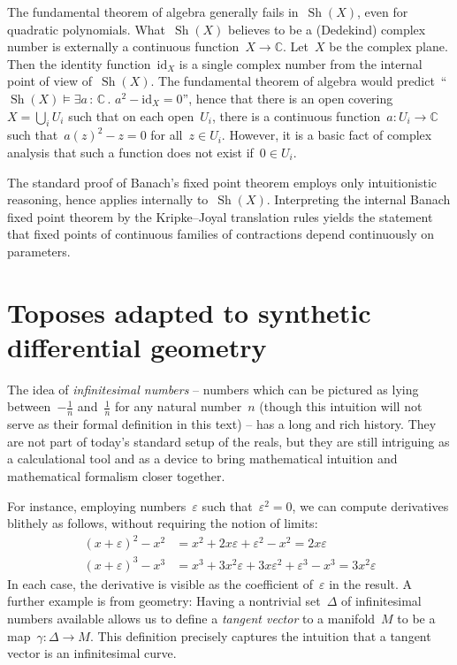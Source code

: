 \documentclass[graybox]{svmult}
\newcommand{\CC}{\mathbb{C}}
\DeclareMathOperator{\Sh}{Sh}
\renewcommand{\_}{\mathpunct{.}\,}
\newcommand{\?}{\,{:}\,}
\begin{document}
\begin{example}The fundamental theorem of algebra generally fails in~$\Sh(X)$, even
for quadratic polynomials. What~$\Sh(X)$ believes to be a (Dedekind)
complex number is externally a continuous function~$X \to \CC$. Let~$X$ be the
complex plane. Then the identity function~$\mathrm{id}_X$ is a single complex number from the
internal point of view of~$\Sh(X)$. The fundamental theorem of algebra would
predict~``$\Sh(X) \models \exists a\?\CC\_ a^2 - \mathrm{id}_X = 0$'',
hence that there is an open covering~$X = \bigcup_i U_i$ such that on each
open~$U_i$, there is a continuous function~$a : U_i \to \CC$ such that~$a(z)^2
- z = 0$ for all~$z \in U_i$. However, it is a basic fact of complex analysis
that such a function does not exist if~$0 \in U_i$.
\end{example}

\begin{example}The standard proof of Banach's fixed point theorem employs only
intuitionistic reasoning, hence applies internally to~$\Sh(X)$. Interpreting the
internal Banach fixed point theorem by the Kripke--Joyal translation rules
yields the statement that fixed points of continuous families of contractions
depend continuously on parameters.
\end{example}


\section{Toposes adapted to synthetic differential geometry}
\label{sect:smooth}

The idea of \emph{infinitesimal numbers} -- numbers which can be pictured as lying between~$-\frac{1}{n}$
and~$\frac{1}{n}$ for any natural number~$n$ (though this intuition will not
serve as their formal definition in this text) -- has a long and rich history. They are
not part of today's standard setup of the reals, but they are still intriguing
as a calculational tool and as a device to bring mathematical intuition and
mathematical formalism closer together.

For instance, employing numbers~$\varepsilon$ such that~$\varepsilon^2 = 0$, we can
compute derivatives blithely as follows, without requiring the notion of
limits:
\begin{equation}\label{eq:derivative}\tag{$\star$}
  \begin{aligned}
    (x + \varepsilon)^2 - x^2 &= x^2 + 2x\varepsilon + \varepsilon^2 - x^2 = 2x\varepsilon \\
    (x + \varepsilon)^3 - x^3 &= x^3 + 3x^2\varepsilon + 3x\varepsilon^2 + \varepsilon^3 - x^3 = 3x^2\varepsilon
  \end{aligned}
\end{equation}
In each case, the derivative is visible as the coefficient of~$\varepsilon$ in
the result. A further example is from geometry: Having a nontrivial
set~$\Delta$ of infinitesimal numbers available allows us to define a
\emph{tangent vector} to a manifold~$M$ to be a map~$\gamma : \Delta \to M$. This
definition precisely captures the intuition that a tangent vector is an
infinitesimal curve.
\end{document}
